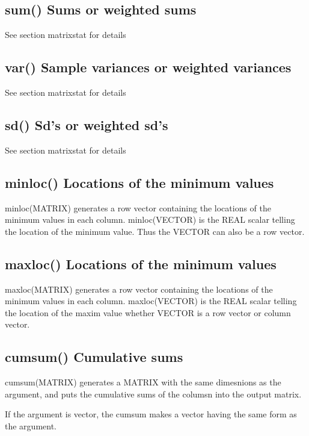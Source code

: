\subsection{\textcolor{VioletRed}{sum}() Sums or weighted sums}
\label{sum}
See section matrixstat for details
\subsection{\textcolor{VioletRed}{var}() Sample variances or weighted variances}
\label{var}
See section matrixstat for details
\subsection{\textcolor{VioletRed}{sd}() Sd's or weighted sd's}
\label{sd}
See section matrixstat for details
\subsection{\textcolor{VioletRed}{minloc}() Locations of the minimum values}
\label{minloc}
\textcolor{VioletRed}{minloc}(MATRIX) generates a row vector containing the locations of the  minimum
values in each column. \textcolor{VioletRed}{minloc}(VECTOR) is the REAL scalar telling
the location of the minimum value. Thus the VECTOR can also be a row vector.
\subsection{\textcolor{VioletRed}{maxloc}() Locations of the minimum values}
\label{maxloc}
\textcolor{VioletRed}{maxloc}(MATRIX) generates a row vector containing the locations of the  minimum
values in each column. \textcolor{VioletRed}{maxloc}(VECTOR) is the REAL scalar telling
the location of the maxim value whether VECTOR is a row vector or column vector.
\subsection{\textcolor{VioletRed}{cumsum}() Cumulative sums}
\label{cumsum}
\textcolor{VioletRed}{cumsum}(MATRIX) generates a MATRIX with the same dimesnions as the argument,
and puts the cumulative sums of the columsn into the output matrix.
\begin{note}
If the argument is vector, the cumsum makes a vector having the same
form as the argument.
\end{note}












